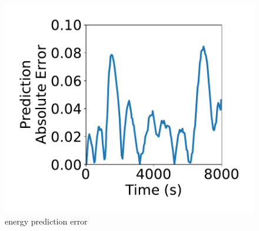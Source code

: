 \begin{figure}[htbp]
	\centering
	\includegraphics[width=.85\columnwidth]{Figure/energy_pred_err}
	\vspace{-0.1in}
	\caption{energy prediction error}
	\label{energy_pred_err}
	\vspace{-0.2in}
\end{figure}
